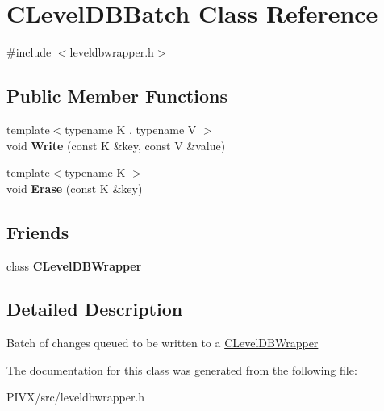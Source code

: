 \hypertarget{class_c_level_d_b_batch}{}\section{C\+Level\+D\+B\+Batch Class Reference}
\label{class_c_level_d_b_batch}


{\ttfamily \#include $<$leveldbwrapper.\+h$>$}

\subsection*{Public Member Functions}
\begin{DoxyCompactItemize}
\item 
\mbox{\label{class_c_level_d_b_batch_ab459da1abafa27e834de9a4cc25b6f2d}} 
{\footnotesize template$<$typename K , typename V $>$ }\\void {\bfseries Write} (const K \&key, const V \&value)
\item 
\mbox{\label{class_c_level_d_b_batch_a22bf093d560b4ce3333e8f4a947faa7f}} 
{\footnotesize template$<$typename K $>$ }\\void {\bfseries Erase} (const K \&key)
\end{DoxyCompactItemize}
\subsection*{Friends}
\begin{DoxyCompactItemize}
\item 
\mbox{\label{class_c_level_d_b_batch_acbe5e6be88c5bccb0ec229ebc91dde82}} 
class {\bfseries C\+Level\+D\+B\+Wrapper}
\end{DoxyCompactItemize}


\subsection{Detailed Description}
Batch of changes queued to be written to a \mbox{\hyperlink{class_c_level_d_b_wrapper}{C\+Level\+D\+B\+Wrapper}} 

The documentation for this class was generated from the following file\+:\begin{DoxyCompactItemize}
\item 
P\+I\+V\+X/src/leveldbwrapper.\+h\end{DoxyCompactItemize}
